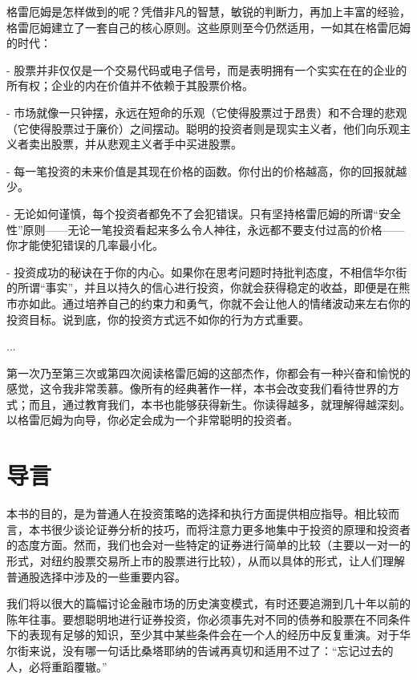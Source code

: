 \documentclass[12pt,oneside]{book}
\begin{document}
格雷厄姆是怎样做到的呢？凭借非凡的智慧，敏锐的判断力，再加上丰富的经验，格雷厄姆建立了一套自己的核心原则。这些原则至今仍然适用，一如其在格雷厄姆的时代：

- 股票并非仅仅是一个交易代码或电子信号，而是表明拥有一个实实在在的企业的所有权；企业的内在价值并不依赖于其股票价格。

- 市场就像一只钟摆，永远在短命的乐观（它使得股票过于昂贵）和不合理的悲观（它使得股票过于廉价）之间摆动。聪明的投资者则是现实主义者，他们向乐观主义者卖出股票，并从悲观主义者手中买进股票。

- 每一笔投资的未来价值是其现在价格的函数。你付出的价格越高，你的回报就越少。

- 无论如何谨慎，每个投资者都免不了会犯错误。只有坚持格雷厄姆的所谓“安全性”原则——无论一笔投资看起来多么令人神往，永远都不要支付过高的价格——你才能使犯错误的几率最小化。

- 投资成功的秘诀在于你的内心。如果你在思考问题时持批判态度，不相信华尔街的所谓“事实”，并且以持久的信心进行投资，你就会获得稳定的收益，即便是在熊市亦如此。通过培养自己的约束力和勇气，你就不会让他人的情绪波动来左右你的投资目标。说到底，你的投资方式远不如你的行为方式重要。

...

第一次乃至第三次或第四次阅读格雷厄姆的这部杰作，你都会有一种兴奋和愉悦的感觉，这令我非常羡慕。像所有的经典著作一样，本书会改变我们看待世界的方式；而且，通过教育我们，本书也能够获得新生。你读得越多，就理解得越深刻。以格雷厄姆为向导，你必定会成为一个非常聪明的投资者。

\section{导言}
本书的目的，是为普通人在投资策略的选择和执行方面提供相应指导。相比较而言，本书很少谈论证券分析的技巧，而将注意力更多地集中于投资的原理和投资者的态度方面。然而，我们也会对一些特定的证券进行简单的比较（主要以一对一的形式，对纽约股票交易所上市的股票进行比较），从而以具体的形式，让人们理解普通股选择中涉及的一些重要内容。

我们将以很大的篇幅讨论金融市场的历史演变模式，有时还要追溯到几十年以前的陈年往事。要想聪明地进行证券投资，你必须事先对不同的债券和股票在不同条件下的表现有足够的知识，至少其中某些条件会在一个人的经历中反复重演。对于华尔街来说，没有哪一句话比桑塔耶纳的告诫再真切和适用不过了：“忘记过去的人，必将重蹈覆辙。”
\end{document}
